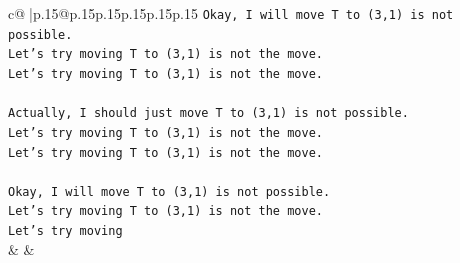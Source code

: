 \documentclass{article}
\begin{document}
{\begin{supertabular}{c@{$\;$}|p{.15\linewidth}@{}p{.15\linewidth}p{.15\linewidth}p{.15\linewidth}p{.15\linewidth}p{.15\linewidth}}
{{{\texttt{Okay, I will move T to (3,1) is not possible.} \\
\texttt{Let's try moving T to (3,1) is not the move.} \\
\texttt{Let's try moving T to (3,1) is not the move.} \\
\\ 
\texttt{Actually, I should just move T to (3,1) is not possible.} \\
\texttt{Let's try moving T to (3,1) is not the move.} \\
\texttt{Let's try moving T to (3,1) is not the move.} \\
\\ 
\texttt{Okay, I will move T to (3,1) is not possible.} \\
\texttt{Let's try moving T to (3,1) is not the move.} \\
\texttt{Let's try moving} \\
            }
        }
    }
    & & \\ \\


\end{supertabular}}
\end{document}
